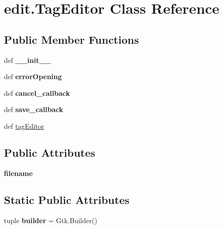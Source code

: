 \hypertarget{classedit_1_1TagEditor}{\section{edit.\-Tag\-Editor Class Reference}
\label{classedit_1_1TagEditor}
}
\subsection*{Public Member Functions}
\begin{DoxyCompactItemize}
\item 
\hypertarget{classedit_1_1TagEditor_a32b9ed3edf034376e542a831212ed2bc}{def {\bfseries \-\_\-\-\_\-init\-\_\-\-\_\-}}\label{classedit_1_1TagEditor_a32b9ed3edf034376e542a831212ed2bc}

\item 
\hypertarget{classedit_1_1TagEditor_a514af08ad751f6368971cb94121c0d48}{def {\bfseries error\-Opening}}\label{classedit_1_1TagEditor_a514af08ad751f6368971cb94121c0d48}

\item 
\hypertarget{classedit_1_1TagEditor_a953ca2da4185dfaeedda31ffd5d9dd2d}{def {\bfseries cancel\-\_\-callback}}\label{classedit_1_1TagEditor_a953ca2da4185dfaeedda31ffd5d9dd2d}

\item 
\hypertarget{classedit_1_1TagEditor_a79e286c1c2d95c1c43b47526bd7b2682}{def {\bfseries save\-\_\-callback}}\label{classedit_1_1TagEditor_a79e286c1c2d95c1c43b47526bd7b2682}

\item 
def \hyperlink{classedit_1_1TagEditor_ab076fe635a4fcbed39d688322a5013b0}{tag\-Editor}
\end{DoxyCompactItemize}
\subsection*{Public Attributes}
\begin{DoxyCompactItemize}
\item 
\hypertarget{classedit_1_1TagEditor_adb26284bfa6ad0f42b164666f33ea1be}{{\bfseries filename}}\label{classedit_1_1TagEditor_adb26284bfa6ad0f42b164666f33ea1be}

\end{DoxyCompactItemize}
\subsection*{Static Public Attributes}
\begin{DoxyCompactItemize}
\item 
\hypertarget{classedit_1_1TagEditor_afa98963cc6e756dbcd68b40f5b9abf83}{tuple {\bfseries builder} = Gtk.\-Builder()}\label{classedit_1_1TagEditor_afa98963cc6e756dbcd68b40f5b9abf83}

\end{DoxyCompactItemize}


